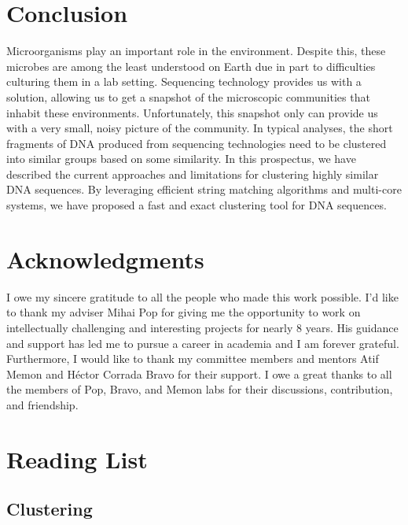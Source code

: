 \documentclass{article}
\begin{document}
\section{Conclusion}

Microorganisms play an important role in the environment.
Despite this, these microbes are among the least understood on Earth due in part to difficulties culturing them in a lab setting.
Sequencing technology provides us with a solution, allowing us to get a snapshot of the microscopic communities that inhabit these environments.
Unfortunately, this snapshot only can provide us with a very small, noisy picture of the community.
In typical analyses, the short fragments of DNA produced from sequencing technologies need to be clustered into similar groups based on some similarity.
In this prospectus, we have described the current approaches and limitations for clustering highly similar DNA sequences.
By leveraging efficient string matching algorithms and multi-core systems, we have proposed a fast and exact clustering tool for DNA sequences.

\newpage


\section{Acknowledgments}

I owe my sincere gratitude to all the people who made this work possible.
I'd like to thank my adviser Mihai Pop for giving me the opportunity to work on intellectually challenging and interesting projects for nearly 8 years.
His guidance and support has led me to pursue a career in academia and I am forever grateful.
Furthermore, I would like to thank my committee members and mentors Atif Memon and H\'ector Corrada Bravo for their support.
I owe a great thanks to all the members of Pop, Bravo, and Memon labs for their discussions, contribution, and friendship.

\appendix
\section{Reading List}
\label{app:readinglist}

\subsection{Clustering}

%
\printbibliography[keyword=chriscluster,heading=subbibliography,heading=none]
\end{document}
